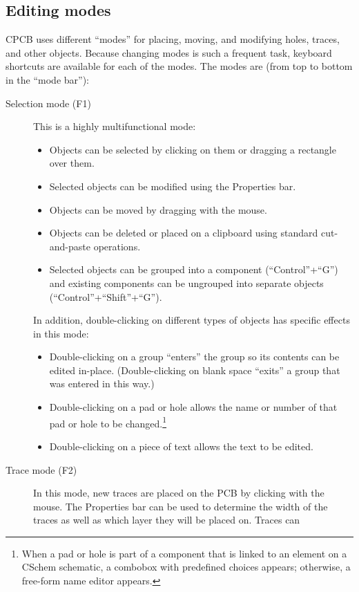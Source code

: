 \documentclass[11pt]{report}
\begin{document}
\subsection{Editing modes}
CPCB uses different ``modes'' for placing, moving, and modifying holes, traces,
and other objects. Because changing modes is such a frequent task,
keyboard shortcuts are available for each of the modes. The modes are
(from top to bottom in the ``mode bar''):
\begin{description}
\item[Selection mode (F1)]This is a highly multifunctional mode:
  \begin{itemize}
  \item Objects can be selected by
    clicking on them or dragging a rectangle over them.
  \item Selected objects can be modified using the Properties bar.
  \item Objects can be moved by dragging with the mouse.
  \item Objects can be deleted or placed on a clipboard using
    standard cut-and-paste operations.
  \item Selected objects can be grouped into a component
    (``Control''+``G'') and existing components can be ungrouped
    into separate objects (``Control''+``Shift''+``G'').
  \end{itemize}
  In addition, double-clicking on different types of objects has
  specific effects in this mode:
  \begin{itemize}
    \item Double-clicking on a group ``enters'' the group so its
      contents can be edited in-place. (Double-clicking on blank space
      ``exits'' a group that was entered in this way.)
    \item Double-clicking on a pad or hole allows the name or number
      of that pad or hole to be changed.\footnote{When a pad or hole
        is part of a component that is linked to an element on a
        CSchem schematic, a combobox with predefined choices appears;
        otherwise, a free-form name editor appears.}
      \item Double-clicking on a piece of text allows the text to be
        edited.
  \end{itemize}
  \item[Trace mode (F2)] In this mode, new traces are placed on the
    PCB by clicking with the mouse. The Properties bar can be used to determine the width of the
    traces as well as which layer they will be placed on. Traces can

\end{description}
\end{document}
